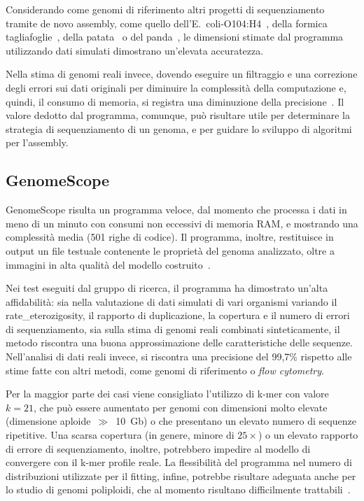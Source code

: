 \documentclass[crop=false, class=book]{standalone}
\begin{document}
	Considerando come genomi di riferimento altri progetti di sequenziamento tramite de novo assembly, come quello dell'E.\  coli-O104:H4~\cite{li2011genomic}, della formica tagliafoglie~\cite{nygaard2011genome}, della patata~\cite{xu2011genome} o del panda~\cite{li2010sequence}, le dimensioni stimate dal programma utilizzando dati simulati dimostrano un'elevata accuratezza. 
	
	Nella stima di genomi reali invece, dovendo eseguire un filtraggio e una correzione degli errori sui dati originali per diminuire la complessità della computazione e, quindi, il consumo di memoria, si registra una diminuzione della precisione~\cite{liu2013GCE}. Il valore dedotto dal programma, comunque, può risultare utile per determinare la strategia di sequenziamento di un genoma, e per guidare lo sviluppo di algoritmi per l'assembly. 
	
	
	\subsection{GenomeScope}
	GenomeScope risulta un programma veloce, dal momento che processa i dati in meno di un minuto con consumi non eccessivi di memoria RAM, e mostrando una complessità media (501 righe di codice). Il programma, inoltre, restituisce in output un file testuale contenente le proprietà del genoma analizzato, oltre a immagini in alta qualità del modello costruito~\cite{vurture2017genomescope}.
	
	Nei test eseguiti dal gruppo di ricerca, il programma ha dimostrato un'alta affidabilità: sia nella valutazione di dati simulati di vari organismi variando il \gls{rate_eterozigosity}, il rapporto di duplicazione, la copertura e il numero di errori di sequenziamento, sia sulla stima di genomi reali combinati sinteticamente, il metodo riscontra una buona approssimazione delle caratteristiche delle sequenze. Nell'analisi di dati reali invece, si riscontra una precisione del 99,7\% rispetto alle stime fatte con altri metodi, come genomi di riferimento o \textit{flow cytometry}. 

	Per la maggior parte dei casi viene consigliato l'utilizzo di k-mer con valore $k = 21$, che può essere aumentato per genomi con dimensioni molto elevate (dimensione aploide~$\gg$~10~Gb) o che presentano un elevato numero di sequenze ripetitive. Una scarsa copertura (in genere, minore di $25\times$) o un elevato rapporto di errore di sequenziamento, inoltre, potrebbero impedire al modello di convergere con il k-mer profile reale. La flessibilità del programma nel numero di distribuzioni utilizzate per il \gls{fitting}, infine, potrebbe risultare adeguata anche per lo studio di genomi poliploidi, che al momento risultano difficilmente trattabili~\cite{sun2017findGSE}.
\end{document}
